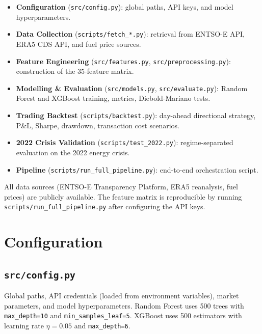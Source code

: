 \documentclass[11pt, a4paper, oneside]{report}
\begin{document}
\begin{itemize}
  \item \textbf{Configuration} (\texttt{src/config.py}): global paths, API keys, and model hyperparameters.
  \item \textbf{Data Collection} (\texttt{scripts/fetch\_*.py}): retrieval from ENTSO-E API, ERA5 CDS API, and fuel price sources.
  \item \textbf{Feature Engineering} (\texttt{src/features.py}, \texttt{src/preprocessing.py}): construction of the 35-feature matrix.
  \item \textbf{Modelling \& Evaluation} (\texttt{src/models.py}, \texttt{src/evaluate.py}): Random Forest and XGBoost training, metrics, Diebold-Mariano tests.
  \item \textbf{Trading Backtest} (\texttt{scripts/backtest.py}): day-ahead directional strategy, P\&L, Sharpe, drawdown, transaction cost scenarios.
  \item \textbf{2022 Crisis Validation} (\texttt{scripts/test\_2022.py}): regime-separated evaluation on the 2022 energy crisis.
  \item \textbf{Pipeline} (\texttt{scripts/run\_full\_pipeline.py}): end-to-end orchestration script.
\end{itemize}

\medskip
\noindent All data sources (ENTSO-E Transparency Platform, ERA5 reanalysis,
fuel prices) are publicly available. The feature matrix is reproducible by
running \texttt{scripts/run\_full\_pipeline.py} after configuring the API keys.

\clearpage

\chapter{Configuration}

\section{\texttt{src/config.py}}

Global paths, API credentials (loaded from environment variables), market
parameters, and model hyperparameters. Random Forest uses 500 trees with
\texttt{max\_depth=10} and \texttt{min\_samples\_leaf=5}. XGBoost uses 500
estimators with learning rate $\eta=0.05$ and \texttt{max\_depth=6}.


\end{document}
